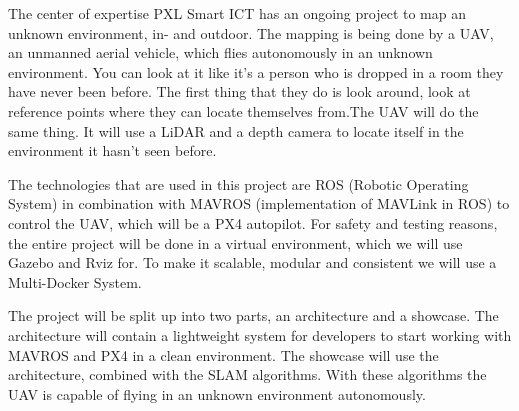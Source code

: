 The center of expertise PXL Smart ICT has an ongoing project to map an unknown environment, in- and outdoor. The mapping is being done by a UAV, an unmanned aerial vehicle, which flies autonomously in an unknown environment. You can look at it like it’s a person who is dropped in a room they have never been before. The first thing that they do is look around, look at reference points where they can locate themselves from.The UAV will do the same thing. It will use a LiDAR and a depth camera to locate itself in the environment it hasn’t seen before.

The technologies that are used in this project are ROS (Robotic Operating System) in combination with MAVROS (implementation of MAVLink in ROS) to control the UAV, which will be a PX4 autopilot. For safety and testing reasons, the entire project will be done in a virtual environment, which we will use Gazebo and Rviz for. To make it scalable, modular and consistent we will use a Multi-Docker System.

The project will be split up into two parts, an architecture and a showcase. The architecture will contain a lightweight system for developers to start working with MAVROS and PX4 in a clean environment. The showcase will use the architecture, combined with the SLAM algorithms. With these algorithms the UAV is capable of flying in an unknown environment autonomously.